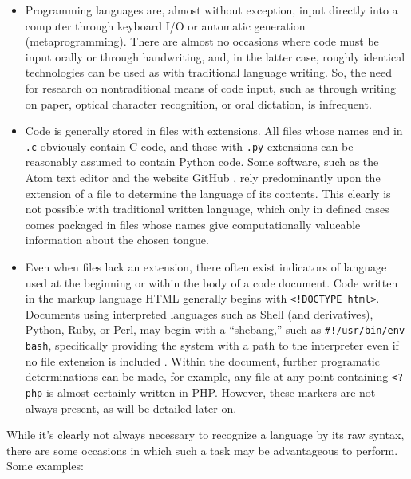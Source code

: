 \documentclass{article}
\begin{document}
\begin{itemize}
    \item{Programming languages are, almost without exception, input directly into a computer through keyboard I/O or automatic generation (metaprogramming). There are almost no occasions where code must be input orally or through handwriting, and, in the latter case, roughly identical technologies can be used as with traditional language writing. So, the need for research on nontraditional means of code input, such as through writing on paper, optical character recognition, or oral dictation, is infrequent.}
    \item{Code is generally stored in files with extensions. All files whose names end in \texttt{.c} obviously contain C code, and those with \texttt{.py} extensions can be reasonably assumed to contain Python code. Some software, such as the Atom text editor and the website GitHub \cite{githubid}, rely predominantly upon the extension of a file to determine the language of its contents. This clearly is not possible with traditional written language, which only in defined cases comes packaged in files whose names give computationally valueable information about the chosen tongue.}
    \item{Even when files lack an extension, there often exist indicators of language used at the beginning or within the body of a code document. Code written in the markup language \cite{htmlnotproglang} HTML generally begins with \texttt{<!DOCTYPE html>}. Documents using interpreted languages such as Shell (and derivatives), Python, Ruby, or Perl, may begin with a ``shebang,'' such as \texttt{#!/usr/bin/env bash}, specifically providing the system with a path to the interpreter even if no file extension is included \cite{shebang}. Within the document, further programatic determinations can be made, for example, any file at any point containing \texttt{<?php} is almost certainly written in PHP. However, these markers are not always present, as will be detailed later on.}
\end{itemize}
While it's clearly not always necessary to recognize a language by its raw syntax, there are some occasions in which such a task may be advantageous to perform. Some examples:
\end{document}
